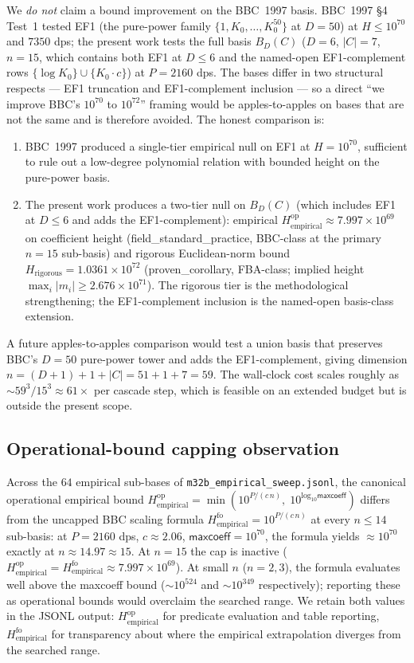\documentclass[11pt,a4paper]{article}
\newcommand{\K}{K_{0}}
\newcommand{\Hrig}{H_{\mathrm{rigorous}}}
\newcommand{\Hempop}{H_{\mathrm{empirical}}^{\mathrm{op}}}
\newcommand{\Hempfo}{H_{\mathrm{empirical}}^{\mathrm{fo}}}
\newcommand{\BDC}{B_{D}(C)}
\newcommand{\fsp}{\textsf{field\_standard\_practice}}
\newcommand{\pc}{\textsf{proven\_corollary}}
\begin{document}
We \emph{do not} claim a bound improvement on the BBC~1997 basis.
BBC~1997 \S 4 Test~1 tested EF1 (the pure-power family
$\{1, \K, \ldots, \K^{50}\}$ at $D=50$) at $H \le 10^{70}$ and $7350$ dps;
the present work tests the full basis $\BDC$
($D=6$, $|C|=7$, $n=15$, which contains both EF1 at $D{\le}6$ and the
named-open EF1-complement rows $\{\log\K\} \cup \{\K \cdot c\}$) at
$P=2160$ dps.
The bases differ in two structural respects --- EF1 truncation and
EF1-complement inclusion --- so a direct
``we improve BBC's $10^{70}$ to $10^{72}$'' framing would be
apples-to-apples on bases that are not the same and is therefore avoided.
The honest comparison is:
\begin{enumerate}[label=(\roman*),itemsep=2pt,topsep=2pt]
\item BBC~1997 produced a single-tier empirical null on EF1 at
  $H = 10^{70}$, sufficient to rule out a low-degree polynomial relation
  with bounded height on the pure-power basis.
\item The present work produces a two-tier null on $\BDC$ (which
  includes EF1 at $D{\le}6$ and adds the EF1-complement): empirical
  $\Hempop \approx 7.997\times 10^{69}$ on coefficient height
  (\fsp{}, BBC-class at the primary $n=15$ sub-basis) and rigorous
  Euclidean-norm bound
  $\Hrig = 1.0361\times 10^{72}$
  (\pc{}, FBA-class; implied height
  $\max_{i}|m_{i}| \ge 2.676\times 10^{71}$).
  The rigorous tier is the methodological strengthening; the
  EF1-complement inclusion is the named-open basis-class extension.
\end{enumerate}
A future apples-to-apples comparison would test a union basis that
preserves BBC's $D=50$ pure-power tower and adds the EF1-complement,
giving dimension $n = (D{+}1) + 1 + |C| = 51 + 1 + 7 = 59$.
The wall-clock cost scales roughly as
$\sim 59^{3}/15^{3} \approx 61\times$
per cascade step, which is feasible on an extended budget but is outside
the present scope.

\subsection{Operational-bound capping observation}\label{sec:discussion-capping}

Across the $64$ empirical sub-bases of
\texttt{m32b\_empirical\_sweep.jsonl},
the canonical operational empirical bound
$\Hempop = \min(10^{P/(c\,n)},\; 10^{\log_{10}\textsf{maxcoeff}})$
differs from the uncapped BBC scaling formula
$\Hempfo = 10^{P/(c\,n)}$
at every $n \le 14$ sub-basis: at $P=2160$ dps, $c \approx 2.06$,
$\textsf{maxcoeff}=10^{70}$, the formula yields
$\approx 10^{70}$
exactly at $n \approx 14.97 \approx 15$.
At $n = 15$ the cap is inactive ($\Hempop = \Hempfo \approx 7.997\times 10^{69}$).
At small $n$ ($n=2, 3$), the formula evaluates well above the
\textsf{maxcoeff} bound ($\sim 10^{524}$ and $\sim 10^{349}$ respectively);
reporting these as operational bounds would overclaim the searched range.
We retain both values in the JSONL output: $\Hempop$ for predicate
evaluation and table reporting, $\Hempfo$ for transparency about where
the empirical extrapolation diverges from the searched range.
\end{document}
